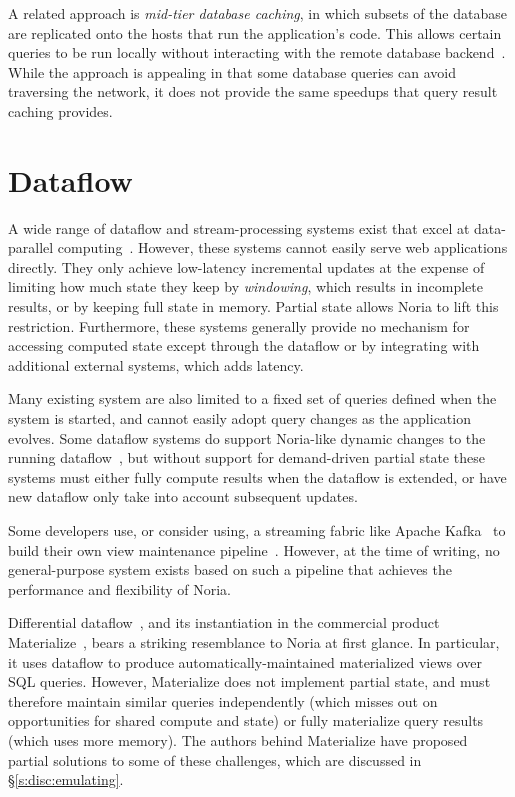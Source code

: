 A related approach is \textit{mid-tier database caching}, in which subsets of
the database are replicated onto the hosts that run the application's code. This
allows certain queries to be run locally without interacting with the remote
database backend~\cite{mtcache}. While the approach is appealing in that some
database queries can avoid traversing the network, it does not provide the same
speedups that query result caching provides.

\section{Dataflow}

A wide range of dataflow and stream-processing systems exist that excel at
data-parallel computing~\cite{dryad, naiad, storm, heron, flink, millwheel,
spark-streaming, stanford-stream, s-store, cloud-dataflow}. However, these
systems cannot easily serve web applications directly. They only achieve
low-latency incremental updates at the expense of limiting how much state they
keep by \textit{windowing}, which results in incomplete results, or by keeping
full state in memory. Partial state allows Noria to lift this restriction.
Furthermore, these systems generally provide no mechanism for accessing computed
state except through the dataflow or by integrating with additional external
systems, which adds latency.

Many existing system are also limited to a fixed set of queries defined when the
system is started, and cannot easily adopt query changes as the application
evolves. Some dataflow systems do support Noria-like dynamic changes to the
running dataflow~\cite{ciel, ray}, but without support for demand-driven partial
state these systems must either fully compute results when the dataflow is
extended, or have new dataflow only take into account subsequent updates.

Some developers use, or consider using, a streaming fabric like Apache
Kafka~\cite{kafka} to build their own view maintenance pipeline~\cite{nyt-kafka,
samza-blogpost}. However, at the time of writing, no general-purpose system
exists based on such a pipeline that achieves the performance and flexibility of
Noria.

Differential dataflow~\cite{differential-dataflow}, and its instantiation in the
commercial product Materialize~\cite{materialize}, bears a striking resemblance
to Noria at first glance. In particular, it uses dataflow to produce
automatically-maintained materialized views over SQL queries. However,
Materialize does not implement partial state, and must therefore maintain
similar queries independently (which misses out on opportunities for shared
compute and state) or fully materialize query results (which uses more memory).
The authors behind Materialize have proposed partial solutions to some of these
challenges, which are discussed in \S\vref{s:disc:emulating}.
